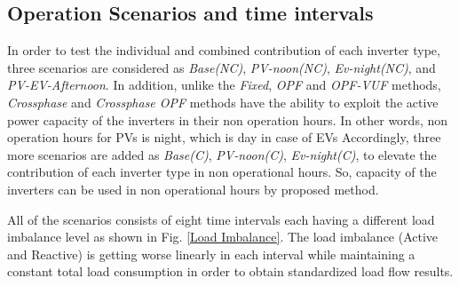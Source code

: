 \documentclass[journal]{IEEEtran}
\begin{document}

\subsection {Operation Scenarios and time intervals}\label{scenario_section}

In order to test the individual and combined contribution of each inverter type, three scenarios are considered as \textit{Base(NC)}, \textit{PV-noon(NC)}, \textit{Ev-night(NC)}, and \textit{PV-EV-Afternoon}. In addition, unlike the \textit{Fixed}, \textit{OPF} and \textit{OPF-VUF} methods, \textit{Crossphase} and \textit{Crossphase OPF} methods have the ability to exploit the active power capacity of the inverters in their non operation hours. In other words, non operation hours for PVs is night, which is day in case of EVs Accordingly, three more scenarios are added as \textit{Base(C)}, \textit{PV-noon(C)}, \textit{Ev-night(C)}, to elevate the contribution of each inverter type in non operational hours. So, capacity of the inverters can be used in non operational hours by proposed method.

All of the scenarios consists of eight time intervals each having a different load imbalance level as shown in Fig. \ref{Load Imbalance}. The load imbalance (Active and Reactive) is getting worse linearly in each interval while maintaining a constant total load consumption in order to obtain standardized load flow results.
 
\end{document}
